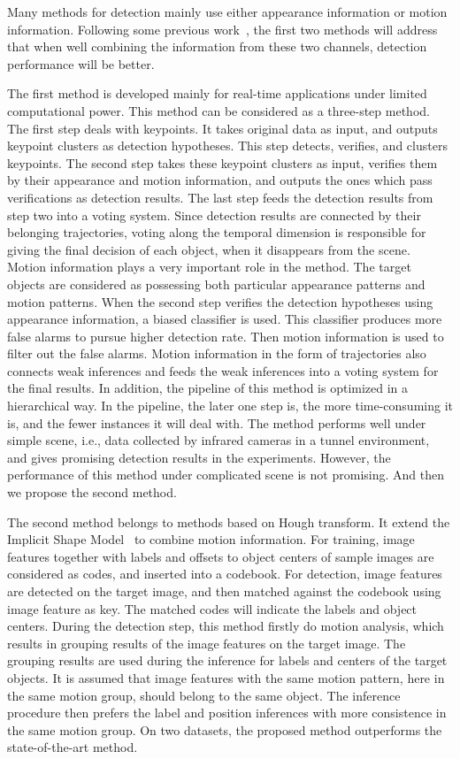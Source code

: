   Many methods for detection mainly use either appearance information or motion information. Following some previous work~\citep{pvm},  the first two methods will address that when well combining the information from these two channels, detection performance will be better.


 The first method is developed mainly for real-time applications under limited computational power.  This method can be considered as a three-step method. The first step deals with keypoints. It
takes original data as input, and outputs keypoint clusters as detection hypotheses. This step detects, verifies, and clusters keypoints. The second
step takes these keypoint clusters as input, verifies them by their appearance and motion
information, and outputs the ones which pass verifications as detection results. The last step feeds the detection results from step two into a voting system. Since detection results are connected by their belonging trajectories, voting along the temporal dimension is responsible for giving the final decision of  each object,  when it disappears from the scene.   Motion information plays a very important role in the method. The target objects are considered as possessing both particular appearance patterns and motion patterns. When the second step verifies the detection hypotheses using appearance information, a biased classifier is used. This classifier produces more false alarms to pursue higher detection rate. Then motion information is used to filter out the false alarms. Motion information in the form of trajectories also connects weak inferences and feeds the weak inferences into a voting system for the final results. In addition, the pipeline of this method is optimized in a hierarchical way. In the pipeline, the later one step is, the more time-consuming it is, and the fewer instances it will deal with. The method performs well under simple scene, i.e., data collected by infrared cameras in a tunnel environment, and gives promising detection results in the experiments. However, the performance of this method under complicated scene is not promising. And then we propose the second method.

The second method belongs to methods based on Hough transform. It extend the Implicit Shape Model~\citep{lb1} to combine motion information. For training, image features together with labels and offsets to object centers of sample images are considered as codes, and inserted into a codebook. For detection, image features are detected on the target image, and then matched against the codebook using image feature as key. The matched codes will indicate the labels and object centers. During the detection step, this method firstly do motion analysis, which results in grouping results of the image features on the target image. The grouping results are used during the inference for labels and centers of the target objects. It is assumed that image features with the same motion pattern, here in the same motion group, should belong to the same object. The inference procedure then prefers the label and position inferences with more consistence in the same motion group. On two datasets, the proposed method outperforms the state-of-the-art method.

